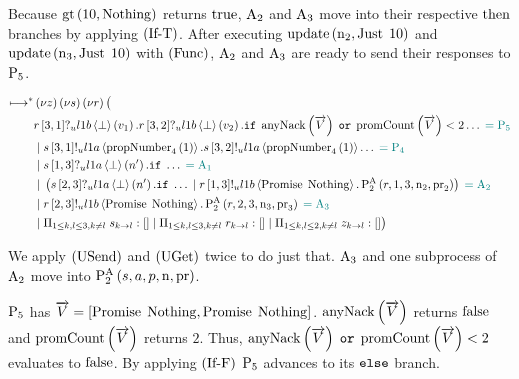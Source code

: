 Because $\greaterThan{10}{\Nothing}$ returns $\True$, $\Acceptor{2}$ and $\Acceptor{3}$ move into their respective $\Then$ branches by applying $\RIfT$.
After executing $\update{\NumberRegister_2}{\Just{10}}$ and $\update{\NumberRegister_3}{\Just{10}}$ with $\RSideEffect$, $\Acceptor{2}$ and $\Acceptor{3}$ are ready to send their responses to $\Proposer{5}$.

\begin{align*}
\mapstostar& \NuChannels \big (\\
&
    \ReceiveUnreliableP{\ChannelR}{3}{1}{\LOneB}{\bot}{v_1}.
    \ReceiveUnreliableP{\ChannelR}{3}{2}{\LOneB}{\bot}{v_2}.
    \mIf \anyNack{\VectorV} \tOr \promiseCount{\VectorV} < 2\ldots
    \comment{= \Proposer{5}}\\
&\Or \SendUnreliableP{\ChannelS}{3}{1}{\LOneA}{\proposalNumber{1}{4}}.\SendUnreliableP{\ChannelS}{3}{2}{\LOneA}{\proposalNumber{1}{4}}\ldots \comment{= \Proposer{4}}\\
&\Or \ReceiveUnreliableP{\ChannelS}{1}{3}{\LOneA}{\bot}{n'}.\mIf \ldots \comment{= \Acceptor{1}}\\
&\Or \Paren{
    \ReceiveUnreliableP{\ChannelS}{2}{3}{\LOneA}{\bot}{n'}.\mIf \ldots
    \Or \SendUnreliableP{\ChannelR}{1}{3}{\LOneB}{\Promise{\Nothing}}.
        \Call{\PaTwo}{\ChannelR, 1, 3, \NumberRegister_2, \ProposalRegister_2}
} \comment{= \Acceptor{2}}\\
&\Or
    \SendUnreliableP{\ChannelR}{2}{3}{\LOneB}{\Promise{\Nothing}}.
    \Call{\PaTwo}{\ChannelR, 2, 3, \NumberRegister_3, \ProposalRegister_3}
    \comment{= \Acceptor{3}}\\
&\Or \InnerSessionQueues{\ChannelS}
\Or \InnerSessionQueues{\ChannelR}
\Or \OuterSessionQueues
\big )
\end{align*}

We apply $\RUsend$ and $\RUget$ twice to do just that.
$\Acceptor{3}$ and one subprocess of $\Acceptor{2}$ move into $\Call{\PaTwo}{\SessionChannel, \AcceptorRole, \ProposerRole, \NumberRegister, \ProposalRegister}$.

$\Proposer{5}$ has $\VectorV = \Bracket{\Promise{\Nothing}, \Promise{\Nothing}}$.
$\anyNack{\VectorV}$ returns $\False$ and $\promiseCount{\VectorV}$ returns $2$.
Thus, $\anyNack{\VectorV} \tOr \promiseCount{\VectorV} < 2$ evaluates to $\False$.
By applying $\RIfF$ $\Proposer{5}$ advances to its $\ElseName$ branch.

